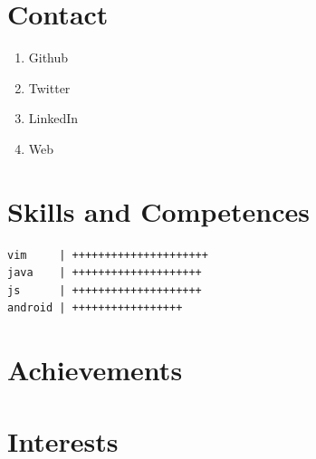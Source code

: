 \documentclass[a4paper]{article}
\begin{document}
  \begin{minipage}[t]{0.4\textwidth}
    \section*{Contact}
    \begin{enumerate}
      \item Github
      \item Twitter
      \item LinkedIn
      \item Web
    \end{enumerate}
    
    
    \section*{Skills and Competences}
    \begin{verbatim}
vim     | +++++++++++++++++++++
java    | ++++++++++++++++++++
js      | ++++++++++++++++++++
android | +++++++++++++++++
    \end{verbatim}
    
    
    \section*{Achievements}

    
    \section*{Interests}
  \end{minipage}
\end{document}
